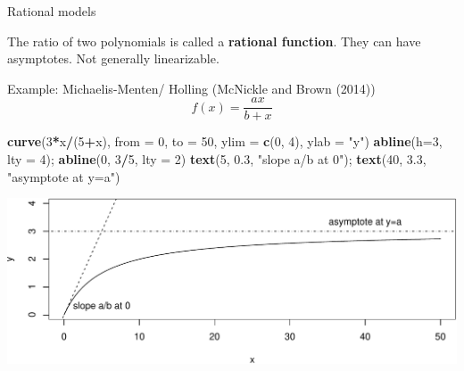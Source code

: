 \documentclass[
  ignorenonframetext,
]{beamer}
\newenvironment{Shaded}{\begin{snugshade}}{\end{snugshade}}
\newcommand{\DataTypeTok}[1]{\textcolor[rgb]{0.13,0.29,0.53}{#1}}
\newcommand{\DecValTok}[1]{\textcolor[rgb]{0.00,0.00,0.81}{#1}}
\newcommand{\FloatTok}[1]{\textcolor[rgb]{0.00,0.00,0.81}{#1}}
\newcommand{\KeywordTok}[1]{\textcolor[rgb]{0.13,0.29,0.53}{\textbf{#1}}}
\newcommand{\NormalTok}[1]{#1}
\newcommand{\OperatorTok}[1]{\textcolor[rgb]{0.81,0.36,0.00}{\textbf{#1}}}
\newcommand{\StringTok}[1]{\textcolor[rgb]{0.31,0.60,0.02}{#1}}
\begin{document}
\begin{frame}[fragile]{Rational models}
\protect\hypertarget{rational-models}{}

The ratio of two polynomials is called a \textbf{rational function}.
They can have asymptotes. Not generally linearizable.

Example: Michaelis-Menten/ Holling (McNickle and Brown (2014)) \[
f(x)=\frac{ax}{b+x}
\] \scriptsize

\begin{Shaded}
\begin{Highlighting}[]
\KeywordTok{curve}\NormalTok{(}\DecValTok{3}\OperatorTok{*}\NormalTok{x}\OperatorTok{/}\NormalTok{(}\DecValTok{5}\OperatorTok{+}\NormalTok{x), }\DataTypeTok{from =} \DecValTok{0}\NormalTok{, }\DataTypeTok{to =} \DecValTok{50}\NormalTok{, }\DataTypeTok{ylim =} \KeywordTok{c}\NormalTok{(}\DecValTok{0}\NormalTok{, }\DecValTok{4}\NormalTok{), }\DataTypeTok{ylab =} \StringTok{"y"}\NormalTok{)}
\KeywordTok{abline}\NormalTok{(}\DataTypeTok{h=}\DecValTok{3}\NormalTok{, }\DataTypeTok{lty =} \DecValTok{4}\NormalTok{); }\KeywordTok{abline}\NormalTok{(}\DecValTok{0}\NormalTok{, }\DecValTok{3}\OperatorTok{/}\DecValTok{5}\NormalTok{, }\DataTypeTok{lty =} \DecValTok{2}\NormalTok{)}
\KeywordTok{text}\NormalTok{(}\DecValTok{5}\NormalTok{, }\FloatTok{0.3}\NormalTok{, }\StringTok{"slope a/b at 0"}\NormalTok{); }\KeywordTok{text}\NormalTok{(}\DecValTok{40}\NormalTok{, }\FloatTok{3.3}\NormalTok{, }\StringTok{"asymptote at y=a"}\NormalTok{) }
\end{Highlighting}
\end{Shaded}

\includegraphics{signal_files/figure-beamer/unnamed-chunk-4-1.pdf}

\end{frame}
\end{document}
